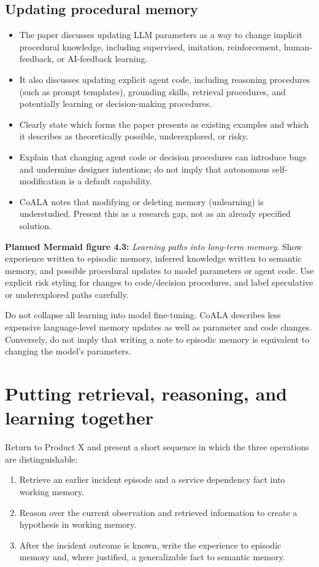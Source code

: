 \subsection*{Updating procedural memory}
\begin{itemize}
  \item The paper discusses updating LLM parameters as a way to change implicit procedural knowledge, including supervised, imitation, reinforcement, human-feedback, or AI-feedback learning.
  \item It also discusses updating explicit agent code, including reasoning procedures (such as prompt templates), grounding skills, retrieval procedures, and potentially learning or decision-making procedures.
  \item Clearly state which forms the paper presents as existing examples and which it describes as theoretically possible, underexplored, or risky.
  \item Explain that changing agent code or decision procedures can introduce bugs and undermine designer intentions; do not imply that autonomous self-modification is a default capability.
  \item CoALA notes that modifying or deleting memory (unlearning) is understudied. Present this as a research gap, not as an already specified solution.
\end{itemize}

\textbf{Planned Mermaid figure 4.3:} \emph{Learning paths into long-term memory}. Show experience written to episodic memory, inferred knowledge written to semantic memory, and possible procedural updates to model parameters or agent code. Use explicit risk styling for changes to code/decision procedures, and label speculative or underexplored paths carefully.

\begin{warningbox}
Do not collapse all learning into model fine-tuning. CoALA describes less expensive language-level memory updates as well as parameter and code changes. Conversely, do not imply that writing a note to episodic memory is equivalent to changing the model's parameters.
\end{warningbox}

\section{Putting retrieval, reasoning, and learning together}
Return to Product X and present a short sequence in which the three operations are distinguishable:
\begin{enumerate}
  \item Retrieve an earlier incident episode and a service dependency fact into working memory.
  \item Reason over the current observation and retrieved information to create a hypothesis in working memory.
  \item After the incident outcome is known, write the experience to episodic memory and, where justified, a generalizable fact to semantic memory.
\end{enumerate}

